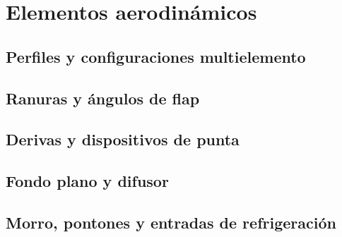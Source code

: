 \chapter{Elementos aerodinámicos}
\label{ch:elementos_aerodinamicos}

\begin{objetivos}
  \item {}
  \item {}
  \item {}
\end{objetivos}


\section{Perfiles y configuraciones multielemento}
\label{sec:elementos_aerodinamicos:01}

\section{Ranuras y ángulos de flap}
\label{sec:elementos_aerodinamicos:02}

\section{Derivas y dispositivos de punta}
\label{sec:elementos_aerodinamicos:03}

\section{Fondo plano y difusor}
\label{sec:elementos_aerodinamicos:04}

\section{Morro, pontones y entradas de refrigeración}
\label{sec:elementos_aerodinamicos:05}

